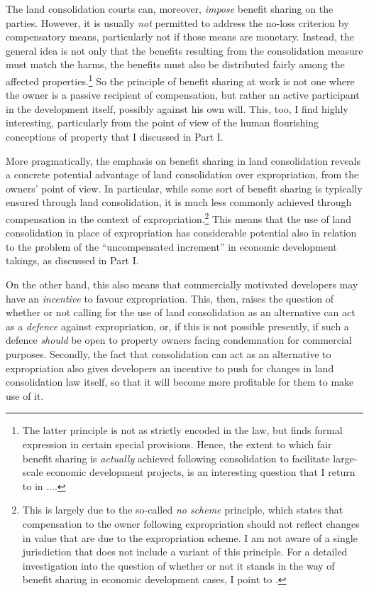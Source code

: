 The land consolidation courts can, moreover, {\it impose} benefit sharing on the parties. However, it  is usually {\it not} permitted to address the no-loss criterion by compensatory means, particularly not if those means are monetary. Instead, the general idea is not only that the benefits resulting from the consolidation measure must match the harms, the benefits must also be distributed fairly among the affected properties.\footnote{The latter principle is not as strictly encoded in the law, but finds formal expression in certain special provisions. Hence, the extent to which fair benefit sharing is {\it actually} achieved following consolidation to facilitate large-scale economic development projects, is an interesting question that I return to in ....} So the principle of benefit sharing at work is not one where the owner is a passive recipient of compensation, but rather an active participant in the development itself, possibly against his own will. This, too, I find highly interesting, particularly from the point of view of the human flourishing conceptions of property that I discussed in Part I.

More pragmatically, the emphasis on benefit sharing in land consolidation reveals a concrete potential advantage of land consolidation over expropriation, from the owners' point of view. In particular, while some sort of benefit sharing is typically ensured through land consolidation, it is much less commonly achieved through compensation in the context of expropriation.\footnote{This is largely due to the so-called {\it no scheme} principle, which states that compensation to the owner following expropriation should not reflect changes in value that are due to the expropriation scheme. I am not aware of a single jurisdiction that does not include a variant of this principle. For a detailed investigation into the question of whether or not it stands in the way of benefit sharing in economic development cases, I point to \cite{....}.} This means that the use of land consolidation in place of expropriation has considerable potential also in relation to the problem of the ``uncompensated increment'' in economic development takings, as discussed in Part I.

On the other hand, this also means that commercially motivated developers may have an {\it incentive} to favour expropriation. This, then, raises the question of whether or not calling for the use of land consolidation as an alternative can act as a {\it defence} against expropriation, or, if this is not possible presently, if such a defence {\it should} be open to property owners facing condemnation for commercial purposes. Secondly, the fact that consolidation can act as an alternative to expropriation  also gives developers an incentive to push for changes in land consolidation law itself, so that it will become more profitable for them to make use of it.

